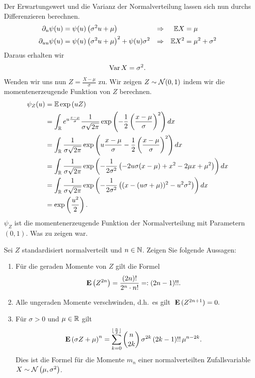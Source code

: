 Der Erwartungswert und die Varianz der Normalverteilung lassen sich nun durchs
Differenzieren berechnen. 
\begin{align*}
    \partial_u \psi(u) &= \psi(u) \left( \sigma^2 u + \mu \right) &\Rightarrow && \mathbb{E} X &= \mu \\
    \partial_{uu} \psi(u) &= \psi(u) \left( \sigma^2 u + \mu \right)^2 + \psi(u) \sigma^2
    & \Rightarrow && \mathbb{E} X^2 &= \mu^2 + \sigma^2
\end{align*}
Daraus erhalten wir 
\begin{align*}
    \operatorname{Var} X = \sigma^2.
\end{align*}
Wenden wir uns nun $Z = \frac{X - \mu}{\sigma}$ zu. Wir zeigen $Z \sim \mathcal N(0,1)$ 
indem wir die momentenerzeugende Funktion von $Z$ berechnen.
\begin{align*}
    \psi_{Z}(u) &= \mathbb{E} \exp \left( u Z \right) \\
    &= \int_{\mathbb{R}} e^{u \frac{x-\mu}{\sigma}} \frac{1}{\sigma \sqrt{2\pi}}
    \exp \left( -\frac{1}{2} \left( \frac{x-\mu}{\sigma} \right)^2 \right) dx \\
    &= \int_{\mathbb{R}} \frac{1}{\sigma\sqrt{2\pi}} 
    \exp \left(  u \frac{x-\mu}{\sigma} -\frac{1}{2} \left( \frac{x-\mu}{\sigma} \right)^2 \right) dx \\
    &= \int_{\mathbb{R}} \frac{1}{\sigma\sqrt{2\pi}} 
    \exp \left( -\frac{1}{2\sigma^2} \left( 
    -2 u \sigma (x-\mu) + x^2 - 2 \mu x + \mu^2 
    \right) \right) dx \\
    &= \int_{\mathbb{R}} \frac{1}{\sigma\sqrt{2\pi}} 
    \exp \left( -\frac{1}{2\sigma^2} \left( 
    (x - (u\sigma+\mu))^2 - u^2 \sigma^2 \right) \right) dx \\
    &= \exp \left( \frac{u^2}{2} \right).
\end{align*}
$\psi_{Z}$ ist die momentenerzeugende Funktion der Normalverteilung mit 
Parametern $(0,1)$. Was zu zeigen war. 


Sei $Z$ standardisiert normalverteilt und $n\in\mathbb N$. Zeigen Sie folgende Aussagen:
\begin{enumerate}
    \item Für die geraden Momente von $Z$ gilt die Formel
        \begin{equation*}
            \mathbf E\left( Z^{2n} \right) = \frac{(2n)!}{2^n \cdot n!} =: \left( 2n-1 \right)!!.
        \end{equation*}
    \item Alle ungeraden Momente verschwinden, d.h.~es gilt  $\; \mathbf E \,(Z^{2n+1})=0.$
    \item Für $\sigma>0$ und $\mu\in\mathbb R$ gilt
        \begin{equation*}
            \mathbf E \left( \sigma Z + \mu \right)^n = 
            \sum_{k=0}^{\lfloor\frac{n}{2}\rfloor} \binom{n}{2k} \,\sigma^{2k} \left( 2k-1 \right)!!\, \mu^{n-2k}.
        \end{equation*}
        Dies ist die Formel für die Momente $m_{n}$ einer normalverteilten
        Zufallsvariable \linebreak $X \sim \mathcal N \left( \mu, \sigma^2 \right)$. 
\end{enumerate}

